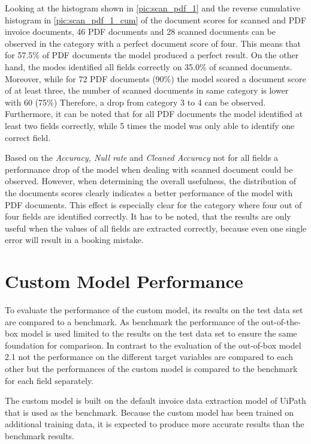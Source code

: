 Looking at the histogram shown in \cref{pic:scan_pdf_1} and the reverse cumulative histogram in \cref{pic:scan_pdf_1_cum} of the document scores for scanned and PDF invoice documents, 46 PDF documents and 28 scanned documents can be observed in the category with a perfect document score of four. This means that for 57.5\% of PDF documents the model produced a perfect result. On the other hand, the modes identified all fields correctly on 35.0\% of scanned documents. 
Moreover, while for 72 PDF documents (90\%) the model scored a document score of at least three, the number of scanned documents in same category is lower with 60 (75\%)
Therefore, a drop from category 3 to 4 can be observed.
Furthermore, it can be noted that for all PDF documents the model identified at least two fields correctly, while 5 times the model was only able to identify one correct field. 

Based on the \textit{Accuracy, Null rate} and \textit{Cleaned Accuracy} not for all fields a performance drop of the model when dealing with scanned document could be observed. However, when determining the overall usefulness, the distribution of the documents scores clearly indicates a better performance of the model with PDF documents. This effect is especially clear for the category where four out of four fields are identified correctly. It has to be noted, that the results are only useful when the values of all fields are extracted correctly, because even one single error will result in a booking mistake.

\newpage
\section{Custom Model Performance}
To evaluate the performance of the custom model, its results on the test data set are compared to a benchmark. As benchmark the performance of the out-of-the-box model is used limited to the results on the test data set to ensure the same foundation for comparison. In contrast to the evaluation of the out-of-box model 2.1 not the performance on the different target variables are compared to each other but the performances of the custom model is compared to the benchmark for each field separately.

The custom model is built on the default invoice data extraction model of UiPath that is used as the benchmark. Because the custom model has been trained on additional training data, it is expected to produce more accurate results than the benchmark results.

